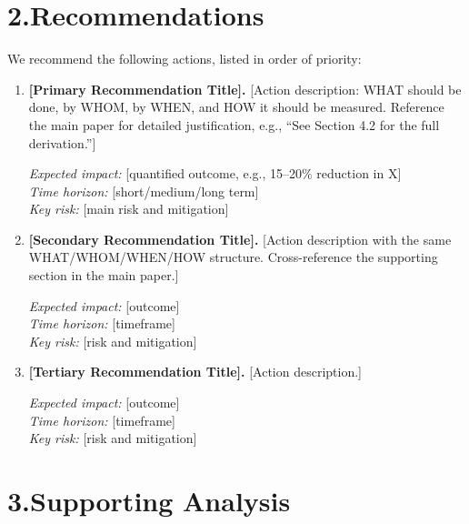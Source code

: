 \documentclass[12pt, a4paper]{article}
\begin{document}
\section*{2.\quad Recommendations}

We recommend the following actions, listed in order of priority:

\begin{enumerate}[label=\textbf{R\arabic*.}, leftmargin=2.5em]
    \item \textbf{[Primary Recommendation Title].}
    [Action description: WHAT should be done, by WHOM, by WHEN, and
    HOW it should be measured. Reference the main paper for detailed
    justification, e.g., ``See Section 4.2 for the full derivation.'']

    \textit{Expected impact:} [quantified outcome, e.g., 15--20\% reduction in X] \\
    \textit{Time horizon:} [short/medium/long term] \\
    \textit{Key risk:} [main risk and mitigation]

    \item \textbf{[Secondary Recommendation Title].}
    [Action description with the same WHAT/WHOM/WHEN/HOW structure.
    Cross-reference the supporting section in the main paper.]

    \textit{Expected impact:} [outcome] \\
    \textit{Time horizon:} [timeframe] \\
    \textit{Key risk:} [risk and mitigation]

    \item \textbf{[Tertiary Recommendation Title].}
    [Action description.]

    \textit{Expected impact:} [outcome] \\
    \textit{Time horizon:} [timeframe] \\
    \textit{Key risk:} [risk and mitigation]
\end{enumerate}

\section*{3.\quad Supporting Analysis}
\end{document}
